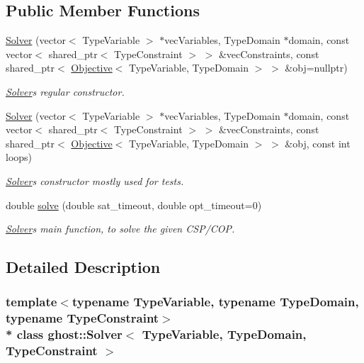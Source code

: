 \subsection*{Public Member Functions}
\begin{DoxyCompactItemize}
\item 
\hyperlink{classghost_1_1Solver_aee74bbdf00494dc209d4909bf9fcb544}{Solver} (vector$<$ Type\+Variable $>$ $\ast$vec\+Variables, Type\+Domain $\ast$domain, const vector$<$ shared\+\_\+ptr$<$ Type\+Constraint $>$ $>$ \&vec\+Constraints, const shared\+\_\+ptr$<$ \hyperlink{classghost_1_1Objective}{Objective}$<$ Type\+Variable, Type\+Domain $>$ $>$ \&obj=nullptr)
\begin{DoxyCompactList}\small\item\em \hyperlink{classghost_1_1Solver}{Solver}\textquotesingle{}s regular constructor. \end{DoxyCompactList}\item 
\hyperlink{classghost_1_1Solver_a512335329b22a91700bdfa7870f053e9}{Solver} (vector$<$ Type\+Variable $>$ $\ast$vec\+Variables, Type\+Domain $\ast$domain, const vector$<$ shared\+\_\+ptr$<$ Type\+Constraint $>$ $>$ \&vec\+Constraints, const shared\+\_\+ptr$<$ \hyperlink{classghost_1_1Objective}{Objective}$<$ Type\+Variable, Type\+Domain $>$ $>$ \&obj, const int loops)
\begin{DoxyCompactList}\small\item\em \hyperlink{classghost_1_1Solver}{Solver}\textquotesingle{}s constructor mostly used for tests. \end{DoxyCompactList}\item 
double \hyperlink{classghost_1_1Solver_a5d15e316f5a4bb8a33c6781058ad0307}{solve} (double sat\+\_\+timeout, double opt\+\_\+timeout=0)
\begin{DoxyCompactList}\small\item\em \hyperlink{classghost_1_1Solver}{Solver}\textquotesingle{}s main function, to solve the given C\+S\+P/\+C\+OP. \end{DoxyCompactList}\end{DoxyCompactItemize}


\subsection{Detailed Description}
\subsubsection*{template$<$typename Type\+Variable, typename Type\+Domain, typename Type\+Constraint$>$\\*
class ghost\+::\+Solver$<$ Type\+Variable, Type\+Domain, Type\+Constraint $>$}

